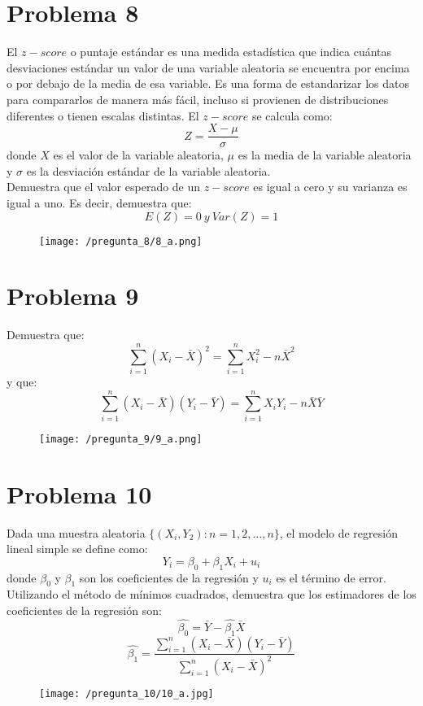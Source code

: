 \documentclass[a4paper]{article}
\begin{document}
\section*{Problema 8}

El $z-score$ o puntaje estándar es una medida estadística que indica cuántas desviaciones estándar un valor de una variable aleatoria se encuentra por encima o por debajo de la media de esa variable. Es una forma de estandarizar los datos para compararlos de manera más fácil, incluso si provienen de distribuciones diferentes o tienen escalas distintas. El $z-score$ se calcula como:
$$
Z=
\frac{X-\mu}{\sigma}
$$
donde $X$ es el valor de la variable aleatoria, $\mu$ es la media de la variable aleatoria y $\sigma$ es la desviación estándar de la variable aleatoria. 
\\
Demuestra que el valor esperado de un $z-score$ es igual a cero y su varianza es igual a uno. Es decir, demuestra que: 
$$
E(Z)=0 \ y \ Var(Z)=1
$$

\begin{figure}[H]
	\centering
	\texttt{[image: /pregunta\_8/8\_a.png]}
\end{figure}

\section*{Problema 9}

Demuestra que: 
$$
\sum_{i=1}^{n}
(X_i-\bar{X})^2
=
\sum_{i=1}^{n}
X_{i}^{2}
-
n
\bar{X}^2
$$
y que: 
$$
\sum_{i=1}^{n}
(X_i-\bar{X})
(Y_i-\bar{Y})
=
\sum_{i=1}^{n}
X_iY_i
-
n
\bar{X}
\bar{Y}
$$

\begin{figure}[H]
	\centering
	\texttt{[image: /pregunta\_9/9\_a.png]}
\end{figure}

\newpage

\section*{Problema 10}

Dada una muestra aleatoria
$\{(X_i, Y_2): n=1,2,\ldots,n\}$, el modelo de regresión lineal simple se define como:
$$
Y_i=
	\beta_0
	+
	\beta_1X_i
	+
	u_i
$$
donde $\beta_0$ y $\beta_1$ son los coeficientes de la regresión y $u_i$ es el término de error. Utilizando el método de mínimos cuadrados, demuestra que los estimadores de los coeficientes de la regresión son:
$$
\hat{\beta_0}=\bar{Y}-\hat{\beta_1}\bar{X}
$$
$$
\hat{\beta_1}
=
\frac
{
	\sum_{i=1}^{n}
	(X_i-\bar{X})
	(Y_i-\bar{Y})
}
{
	\sum_{i=1}^{n}
	(X_i-\bar{X})^2
}
$$

\begin{figure}[H]
	\centering
	\texttt{[image: /pregunta\_10/10\_a.jpg]}
\end{figure}
\end{document}
